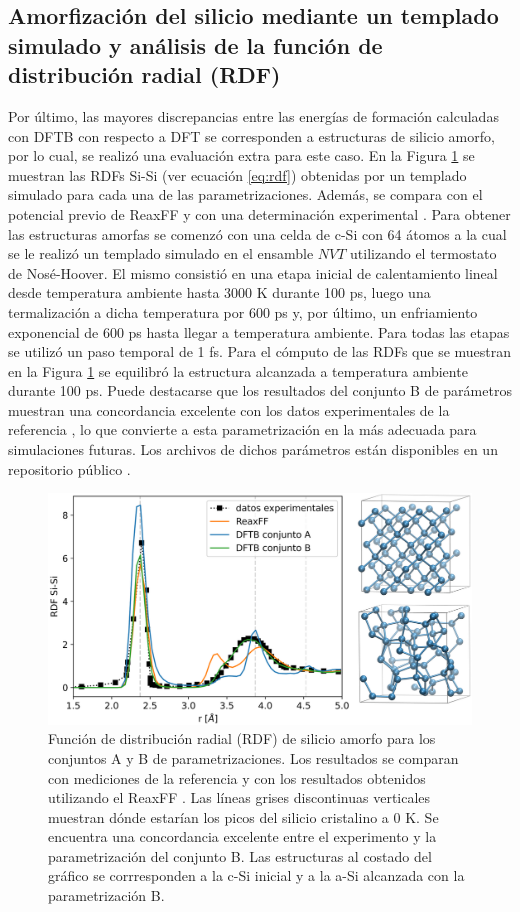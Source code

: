 \subsection{Amorfización del silicio mediante un templado simulado y análisis de la función de distribución radial (RDF)}\label{s:rdfb}

Por último, las mayores discrepancias entre las energías de formación calculadas con DFTB
con respecto a DFT se corresponden a estructuras de silicio amorfo, por lo cual,
se realizó una evaluación extra para este caso. En la Figura \ref{fig:rdfb} se 
muestran las RDFs Si-Si (ver ecuación \ref{eq:rdf}) obtenidas por un templado simulado para cada una de las
parametrizaciones. Además, se compara con el potencial previo de ReaxFF 
\cite{fan2013} y con una determinación experimental \cite{laaziri1999}. Para 
obtener las estructuras amorfas se comenzó con una celda de c-Si con 64 átomos 
a la cual se le realizó un templado simulado en el ensamble $NVT$ utilizando el 
termostato de Nosé-Hoover. El mismo consistió en una etapa inicial de 
calentamiento lineal desde temperatura ambiente hasta 3000 K durante 100 ps, luego una
termalización a dicha temperatura por 600 ps y, por último, un enfriamiento 
exponencial de 600 ps hasta llegar a temperatura ambiente. Para todas las etapas
se utilizó un paso temporal de 1 fs. Para el cómputo de las RDFs que se muestran
en la Figura \ref{fig:rdfb} se equilibró la estructura alcanzada a temperatura 
ambiente durante 100 ps. Puede destacarse que los resultados del conjunto B de parámetros muestran
una concordancia excelente con los datos experimentales de la referencia 
\cite{laaziri1999}, lo que convierte a esta parametrización en la más adecuada
para simulaciones futuras. Los archivos de dichos parámetros están disponibles
en un repositorio público \cite{dftb_lisi}.
\begin{figure}[h!]
    \centering
    \includegraphics[width=.7\textwidth]{Silicio/modelo/resultados/rdf/rdf.png}
    \caption{Función de distribución radial (RDF) de silicio amorfo para los
    conjuntos A y B de parametrizaciones. Los resultados se comparan con 
    mediciones de la referencia \cite{laaziri1999} y con los resultados obtenidos
    utilizando el ReaxFF \cite{fan2013}. Las líneas grises discontinuas verticales
    muestran dónde estarían los picos del silicio cristalino a 0 K. Se encuentra 
    una concordancia excelente entre el experimento y la parametrización del 
    conjunto B. Las estructuras al costado del gráfico se corrresponden a la 
    c-Si inicial y a la a-Si alcanzada con la parametrización B.}
    \label{fig:rdfb}
\end{figure}
